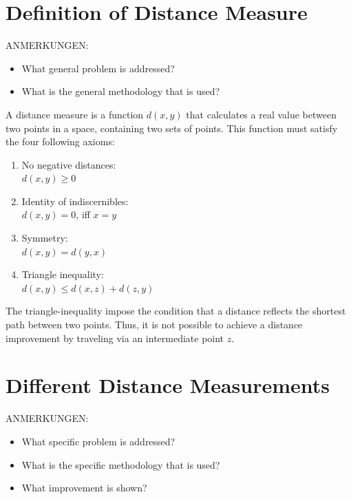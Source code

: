 \documentclass[12pt]%
{article}
\begin{document}
\section{Definition of Distance Measure}
\label{def_DM}
ANMERKUNGEN:
\begin{itemize}
\item What general problem is addressed?
\item What is the general methodology that is used?
\end{itemize}
A distance measure is a function $d(x, y)$ that calculates a real value between two points in a space, containing two sets of points. This function must satisfy the four following axioms:
\begin{enumerate}
\item No negative distances:\\
$d(x, y) \geq 0$
\item Identity of indiscernibles:\\
$d(x, y) = 0$, iff $x = y$
\item Symmetry: \\
$d(x, y) = d(y, x)$
\item Triangle inequality: \\
$d(x, y) \leq d(x, z) + d(z, y)$
\end{enumerate}
The triangle-inequality impose the condition that a distance reflects the shortest path between two points. Thus, it is not possible to achieve a distance improvement by traveling via an intermediate point $z$. \cite{MMDS}

\section{Different Distance Measurements}
ANMERKUNGEN:
\begin{itemize}
\item What specific problem is addressed?
\item What is the specific methodology that is used?
\item What improvement is shown?
\end{itemize}
\end{document}
